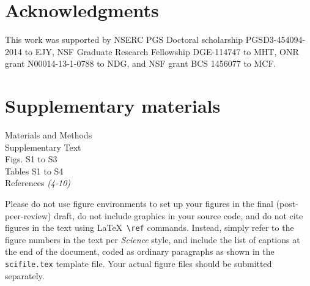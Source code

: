 \documentclass[12pt]{article}
\begin{document}








\section*{Acknowledgments}
This work was supported by NSERC PGS Doctoral scholarship PGSD3-454094-2014 to EJY, NSF Graduate Research Fellowship DGE-114747 to MHT, ONR grant N00014-13-1-0788 to NDG, and NSF grant BCS 1456077 to MCF.

\section*{Supplementary materials}
Materials and Methods\\
Supplementary Text\\
Figs. S1 to S3\\
Tables S1 to S4\\
References \textit{(4-10)}




\clearpage

 Please do not use figure environments to set
up your figures in the final (post-peer-review) draft, do not include graphics in your
source code, and do not cite figures in the text using \LaTeX\
\verb+\ref+ commands.  Instead, simply refer to the figure numbers in
the text per {\it Science\/} style, and include the list of captions at
the end of the document, coded as ordinary paragraphs as shown in the
\texttt{scifile.tex} template file.  Your actual figure files should
be submitted separately.
\end{document}
